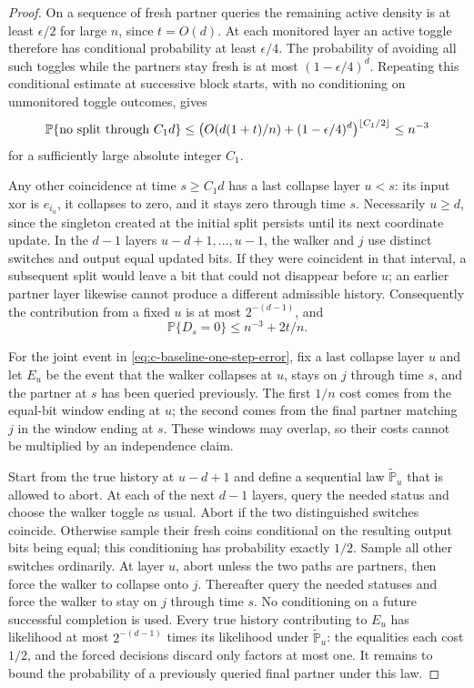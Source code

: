 \begin{proof}
On a sequence of fresh partner queries the remaining active density
is at least $\epsilon/2$ for large $n$, since $t=O(d)$.  At each
monitored layer an active toggle therefore has conditional probability
at least $\epsilon/4$.  The probability of avoiding all such toggles
while the partners stay fresh is at most $(1-\epsilon/4)^d$.
Repeating this conditional estimate at successive block starts, with
no conditioning on unmonitored toggle outcomes, gives
\[
 \mathbb P\{\hbox{no split through }C_1d\}
 \le\bigl(O(d(1+t)/n)+(1-\epsilon/4)^d\bigr)^{\lfloor C_1/2\rfloor}
 \le n^{-3}
\]
for a sufficiently large absolute integer $C_1$.

Any other coincidence at time $s\ge C_1d$ has a last collapse layer
$u<s$: its input xor is $e_{i_u}$, it collapses to zero, and it stays
zero through time $s$.  Necessarily $u\ge d$, since the singleton
created at the initial split persists until its next coordinate
update.  In the $d-1$ layers $u-d+1,\ldots,u-1$, the walker and $j$
use distinct switches and output equal updated bits.  If they were
coincident in that interval, a subsequent split would leave a bit
that could not disappear before $u$; an earlier partner layer likewise
cannot produce a different admissible history.  Consequently the
contribution from a fixed $u$ is at most $2^{-(d-1)}$, and
\begin{equation}
 \mathbb P\{D_s=0\}\le n^{-3}+2t/n.
 \label{eq:c-baseline-rough-coincidence}
\end{equation}

For the joint event in \eqref{eq:c-baseline-one-step-error}, fix a
last collapse layer $u$ and let $E_u$ be the event that the
walker collapses at $u$, stays on $j$ through time $s$, and the partner
at $s$ has been queried previously. The first $1/n$ cost comes from
the equal-bit window ending at $u$; the second comes from the final
partner matching $j$ in the window ending at $s$. These windows may
overlap, so their costs cannot be multiplied by an independence claim.

Start from the true history at $u-d+1$ and define a sequential law
$\widetilde{\mathbb P}_u$ that is allowed to abort. At each of the next
$d-1$ layers, query the
needed status and choose the walker toggle as usual.  Abort if the two
distinguished switches coincide.  Otherwise sample their fresh coins
conditional on the resulting output bits being equal; this conditioning
has probability exactly $1/2$.  Sample all other switches ordinarily.
At layer $u$, abort unless the two paths are partners, then force the
walker to collapse onto $j$.  Thereafter query the needed statuses and
force the walker to stay on $j$ through time $s$.  No conditioning on
a future successful completion is used. Every true history contributing
to $E_u$ has likelihood at most $2^{-(d-1)}$ times its likelihood under
$\widetilde{\mathbb P}_u$: the equalities each cost $1/2$, and the forced
decisions discard only factors at most one. It remains to bound the
probability of a previously queried final partner under this law.


\end{proof}

